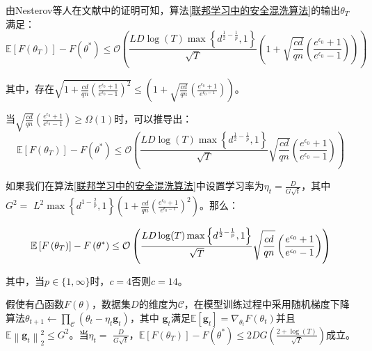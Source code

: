 由Nesterov等人在文献中的证明可知，算法\ref{联邦学习中的安全混洗算法}的输出$\theta_{T}$满足：
\begin{equation}\label{eq:模型收敛性证明2}
\mathbb{E}\left[F\left(\theta_{T}\right)\right]-F\left(\theta^{*}\right) \leq \mathcal{O}\left(\frac{L D \log (T) \max \left\{d^{\frac{1}{2}-\frac{1}{p}}, 1\right\}}{\sqrt{T}}\left(1+\sqrt{\frac{c d}{q n}}\left(\frac{e^{\epsilon_{0}}+1}{e^{\epsilon_{0}}-1}\right)\right)\right)
\end{equation}

其中，存在$\sqrt{1+\frac{c d}{q n}\left(\frac{e^{\epsilon_{0}}+1}{e^{\epsilon_{0}}-1}\right)^{2}} \leq\left(1+\sqrt{\frac{c d}{q n}}\left(\frac{e^{\epsilon_{0}}+1}{e^{\epsilon_{0}-1}}\right)\right)$。

当$\sqrt{\frac{c d}{q n}}\left(\frac{e^{\epsilon_{0}}+1}{e^{\epsilon_{0}}-1}\right) \geq \Omega(1)$时，可以推导出：
\begin{equation}\label{eq:模型收敛性证明3}
\mathbb{E}\left[F\left(\theta_{T}\right)\right]-F\left(\theta^{*}\right) \leq \mathcal{O}\left(\frac{L D \log (T) \max \left\{d^{\frac{1}{2}-\frac{1}{p}}, 1\right\}}{\sqrt{T}} \sqrt{\frac{c d}{q n}}\left(\frac{e^{\epsilon_{0}}+1}{e^{\epsilon_{0}}-1}\right)\right)
\end{equation}

如果我们在算法\ref{联邦学习中的安全混洗算法}中设置学习率为$\eta_{t}=\frac{D}{G \sqrt{t}}$，其中\\$G^{2}=$ $L^{2} \max \left\{d^{1-\frac{2}{p}}, 1\right\}\left(1+\frac{c d}{q n}\left(\frac{e^{\epsilon_{0}}+1}{e^{\epsilon_{0}-1}}\right)^{2}\right)$。那么：

\begin{equation}\label{eq:模型收敛性证明4}
\mathbb{E}\left[F\left(\theta_{T}\right)\right]-F\left(\theta^{*}\right) \leq \\
\mathcal{O}\left(\frac{L D \log (T) \max \left\{d^{\frac{1}{2}-\frac{1}{p}}, 1\right\}}{\sqrt{T}} \sqrt{\frac{c d}{q n}}\left(\frac{e^{\epsilon_{0}}+1}{e^{\epsilon_{0}}-1}\right)\right)
\end{equation}

其中，当$p \in\{1, \infty\}$时，$c=4$否则$c=14$。

\begin{theorem}[随机梯度下降算法的收敛性]\label{随机梯度下降算法的收敛性}
假使有凸函数$F(\theta)$，数据集$D$的维度为$\mathcal{C}$，在模型训练过程中采用随机梯度下降算法$\theta_{t+1} \leftarrow \prod_{\mathcal{C}}\left(\theta_{t}-\eta_{t} \mathbf{g}_{t}\right)$，其中 $\mathbf{g}_{t}$满足$\mathbb{E}\left[\mathbf{g}_{t}\right]=\nabla_{\theta_{t}} F\left(\theta_{t}\right)$并且$\mathbb{E}\left\|\mathbf{g}_{t}\right\|_{2}^{2} \leq G^{2}$。当$\eta_{t}=$ $\frac{D}{G \sqrt{t}}$，$\mathbb{E}\left[F\left(\theta_{T}\right)\right]-F\left(\theta^{*}\right) \leq 2 D G\left(\frac{2+\log (T)}{\sqrt{T}}\right)$成立。
\end{theorem}

